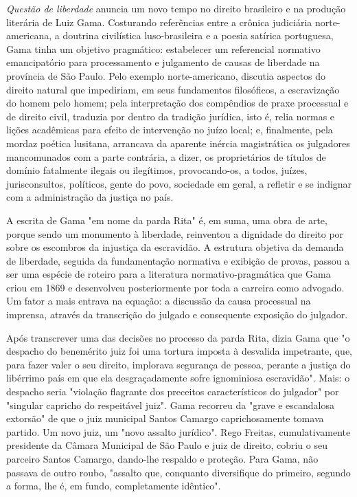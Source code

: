 \emph{Questão de liberdade} anuncia um novo tempo no direito brasileiro
e na produção literária de Luiz Gama. Costurando referências entre a
crônica judiciária norte-americana, a doutrina civilística
luso-brasileira e a poesia satírica portuguesa, Gama tinha um objetivo
pragmático: estabelecer um referencial normativo emancipatório para
processamento e julgamento de causas de liberdade na província de São
Paulo. Pelo exemplo norte-americano, discutia aspectos do direito
natural que impediriam, em seus fundamentos filosóficos, a escravização
do homem pelo homem; pela interpretação dos compêndios de praxe
processual e de direito civil, traduzia por dentro da tradição jurídica,
isto é, relia normas e lições acadêmicas para efeito de intervenção no
juízo local; e, finalmente, pela mordaz poética lusitana, arrancava da
aparente inércia magistrática os julgadores mancomunados com a parte
contrária, a dizer, os proprietários de títulos de domínio fatalmente
ilegais ou ilegítimos, provocando-os, a todos, juízes, jurisconsultos,
políticos, gente do povo, sociedade em geral, a refletir e se indignar
com a administração da justiça no país.

A escrita de Gama "em nome da parda Rita" é, em suma, uma obra de arte,
porque sendo um monumento à liberdade, reinventou a dignidade do direito
por sobre os escombros da injustiça da escravidão. A estrutura objetiva
da demanda de liberdade, seguida da fundamentação normativa e exibição
de provas, passou a ser uma espécie de roteiro para a literatura
normativo-pragmática que Gama criou em 1869 e desenvolveu posteriormente
por toda a carreira como advogado. Um fator a mais entrava na equação: a
discussão da causa processual na imprensa, através da transcrição do
julgado e consequente exposição do julgador.

Após transcrever uma das decisões no processo da parda Rita, dizia Gama
que "o despacho do benemérito juiz foi uma tortura imposta à desvalida
impetrante, que, para fazer valer o seu direito, implorava segurança de
pessoa, perante a justiça do libérrimo país em que ela desgraçadamente
sofre ignominiosa escravidão". Mais: o despacho seria "violação
flagrante dos preceitos característicos do julgador" por "singular
capricho do respeitável juiz". Gama recorreu da "grave e escandalosa
extorsão" de que o juiz municipal Santos Camargo caprichosamente tomava
partido. Um novo juiz, um "novo assalto jurídico". Rego Freitas,
cumulativamente presidente da Câmara Municipal de São Paulo e juiz de
direito, cobriu o seu parceiro Santos Camargo, dando-lhe respaldo e
proteção. Para Gama, não passava de outro roubo, "assalto que, conquanto
diversifique do primeiro, segundo a forma, lhe é, em fundo,
completamente idêntico".

